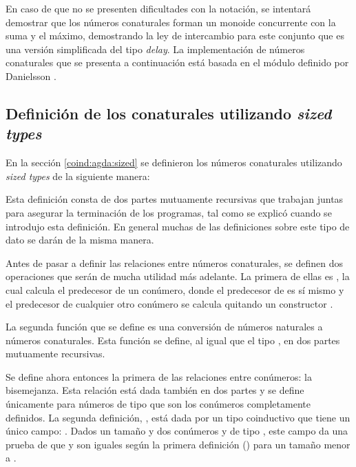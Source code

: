 En caso de que no se presenten dificultades con la notación, se intentará demostrar que los números conaturales forman un monoide concurrente con la suma y el máximo, demostrando la ley de intercambio para este conjunto que es una versión simplificada del tipo \textit{delay}. La implementación de números conaturales que se presenta a continuación está basada en el módulo \href{https://www.cse.chalmers.se/~nad/publications/danielsson-definitional-interpreters-looping/Conat.html}{} definido por Danielsson \cite{danielsson:2018}. 

\subsection{Definición de los conaturales utilizando \textit{sized types}}\label{casodelay:sized:def}

En la sección \ref{coind:agda:sized} se definieron los números conaturales utilizando \textit{sized types} de la siguiente manera:

Esta definición consta de dos partes mutuamente recursivas que trabajan juntas para asegurar la terminación de los programas, tal como se explicó cuando se introdujo esta definición. En general muchas de las definiciones sobre este tipo de dato se darán de la misma manera. 

Antes de pasar a definir las relaciones entre números conaturales, se definen dos operaciones que serán de mucha utilidad más adelante. La primera de ellas es , la cual calcula el predecesor de un conúmero, donde el predecesor de  es sí mismo y el predecesor de cualquier otro conúmero se calcula quitando un constructor .

La segunda función que se define es una conversión de números naturales a números conaturales. Esta función se define, al igual que el tipo , en dos partes mutuamente recursivas.

Se define ahora entonces la primera de las relaciones entre conúmeros: la bisemejanza. Esta relación está dada también en dos partes y se define únicamente para números de tipo  que son los conúmeros completamente definidos. La segunda definición, , está dada por un tipo  coinductivo que tiene un único campo: . Dados un tamaño  y dos conúmeros  y  de tipo , este campo da una prueba de que  y  son iguales según la primera definición (\AgdaFunction{$[\_]\_\sim\_$}) para un tamaño  menor a . 

